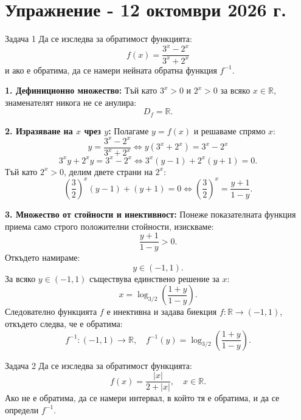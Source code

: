 
\section{Упражнение - 12 октомври 2026 г.}

\begin{problembox}{Задача 1}
Да се изследва за обратимост функцията:
\[
f(x) = \frac{3^x - 2^x}{3^x + 2^x}
\]
и ако е обратима, да се намери нейната обратна функция $f^{-1}$.
\end{problembox}

\begin{solution}
\textbf{1. Дефиниционно множество:}
Тъй като $3^x > 0$ и $2^x > 0$ за всяко $x \in \mathbb{R}$, знаменателят никога не се анулира:
\[
D_f = \mathbb{R}.
\]

\textbf{2. Изразяване на $x$ чрез $y$:}
Полагаме $y = f(x)$ и решаваме спрямо $x$:
\[
y = \frac{3^x - 2^x}{3^x + 2^x} \iff y(3^x + 2^x) = 3^x - 2^x
\]
\[
3^x y + 2^x y = 3^x - 2^x \iff 3^x(y - 1) + 2^x(y + 1) = 0.
\]
Тъй като $2^x > 0$, делим двете страни на $2^x$:
\[
\left(\frac{3}{2}\right)^x (y - 1) + (y + 1) = 0 \iff \left(\frac{3}{2}\right)^x = \frac{y + 1}{1 - y}.
\]

\textbf{3. Множество от стойности и инективност:}
Понеже показателната функция приема само строго положителни стойности, изискваме:
\[
\frac{y + 1}{1 - y} > 0.
\]
Откъдето намираме:
\[
y \in (-1, 1).
\]
За всяко $y \in (-1, 1)$ съществува единствено решение за $x$:
\[
x = \log_{3/2}\left(\frac{1 + y}{1 - y}\right).
\]
Следователно функцията $f$ е инективна и задава биекция $f: \mathbb{R} \to (-1, 1)$, откъдето следва, че е обратима:
\[
f^{-1}: (-1, 1) \to \mathbb{R}, \quad f^{-1}(y) = \log_{3/2}\left(\frac{1 + y}{1 - y}\right).
\]
\end{solution}

\vspace{1em}

\begin{problembox}{Задача 2}
Да се изследва за обратимост функцията:
\[
f(x) = \frac{|x|}{2 + |x|}, \quad x \in \mathbb{R}.
\]
Ако не е обратима, да се намери интервал, в който тя е обратима, и да се определи $f^{-1}$.
\end{problembox}

